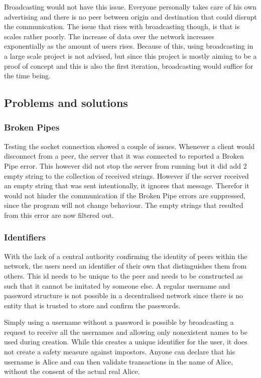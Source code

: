 \documentclass[]{article}
\begin{document}
Broadcasting would not have this issue. Everyone personally takes care of his own advertising and there is no peer between origin and destination that could disrupt the communication. The issue that rises with broadcasting though, is that is scales rather poorly. The increase of data over the network increases exponentially as the amount of users rises. Because of this, using broadcasting in a large scale project is not advised, but since this project is mostly aiming to be a proof of concept and this is also the first iteration, broadcasting would suffice for the time being.

\subsection{Problems and solutions}
\subsubsection{Broken Pipes}
Testing the socket connection showed a couple of issues. Whenever a client would disconnect from a peer, the server that it was connected to reported a Broken Pipe error. This however did not stop the server from running but it did add 2 empty string to the collection of received strings. However if the server received an empty string that was sent intentionally, it ignores that message. Therefor it would not hinder the communication if the Broken Pipe errors are suppressed, since the program will not change behaviour. The empty strings that resulted from this error are now filtered out.

\subsubsection{Identifiers}
With the lack of a central authority confirming the identity of peers within the network, the users need an identifier of their own that distinguishes them from others. This id needs to be unique to the peer and needs to be constructed as such that it cannot be imitated by someone else. A regular username and password structure is not possible in a decentralised network since there is no entity that is trusted to store and confirm the passwords.

Simply using a username without a password is possible by broadcasting a request to receive all the usernames and allowing only nonexistent names to be used during creation. While this creates a unique identifier for the user, it does not create a safety measure against impostors. Anyone can declare that his username is Alice and can then validate transactions in the name of Alice, without the consent of the actual real Alice.
\end{document}
